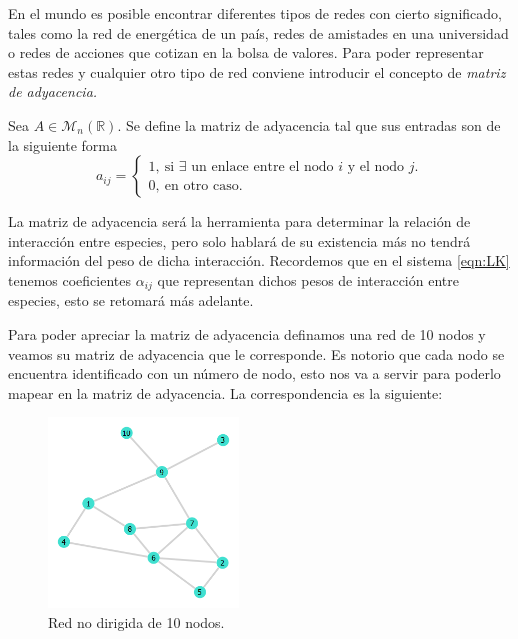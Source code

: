 En el mundo es posible encontrar diferentes tipos de redes con cierto significado, tales como la red de energética de un país, redes de amistades en una universidad o redes de acciones que cotizan en la bolsa de valores. Para poder representar estas redes y cualquier otro tipo de red conviene introducir el concepto de \textit{matriz de adyacencia.}
\begin{definición}\label{def:1}
	Sea $A\in\mathcal{M}_n(\mathbb{R}) $. Se define la matriz de adyacencia tal que sus entradas son de la siguiente forma
	$$a_{ij}= 
	\begin{cases}
		1, \ \text{si $\exists$ un enlace entre el nodo $i$ y el nodo $j$.}\\
		0, \ \text{en otro caso}.
	\end{cases}$$
\end{definición}
La matriz de adyacencia será la herramienta para determinar la relación de interacción entre especies, pero solo hablará de su existencia más no tendrá información del peso de dicha interacción. Recordemos que en el sistema \ref{eqn:LK} tenemos coeficientes $\alpha_{ij}$ que representan dichos pesos de interacción entre especies, esto se retomará más adelante. 
\begin{ejemplo}
	Para poder apreciar la matriz de adyacencia definamos una red de 10 nodos y veamos su matriz de adyacencia que le corresponde. Es notorio que cada nodo se encuentra identificado con un número de nodo, esto nos va a servir  para poderlo mapear en la matriz de adyacencia. La correspondencia es la siguiente:
\end{ejemplo}
\begin{figure} \vspace{-30pt} \begin{center}
		\includegraphics[width=0.45\textwidth]{../../Imagenes/Red10} 
	\end{center} 
	\vspace{-20pt} 
	\caption{Red no dirigida de 10 nodos.} 
	\vspace{-120pt}
	\label{fig:Red10}
\end{figure} 

